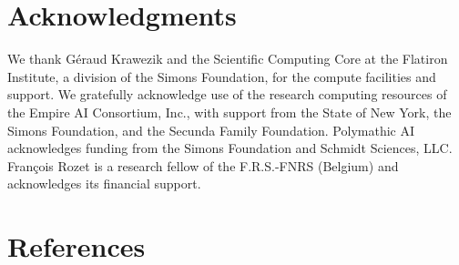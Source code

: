 \section*{Acknowledgments}

We thank Géraud Krawezik and the Scientific Computing Core at the Flatiron Institute, a division of the Simons Foundation, for the compute facilities and support. We gratefully acknowledge use of the research computing resources of the Empire AI Consortium, Inc., with support from the State of New York, the Simons Foundation, and the Secunda Family Foundation. Polymathic AI acknowledges funding from the Simons Foundation and Schmidt Sciences, LLC. François Rozet is a research fellow of the F.R.S.-FNRS (Belgium) and acknowledges its financial support.

\clearpage
\section*{References}

\printbibliography[heading=none]

